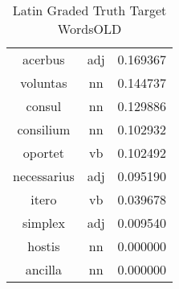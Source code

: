 \begin{table}[h]
\begin{tabular}{ccc}
acerbus     & adj & 0.169367         \\
voluntas    & nn  & 0.144737         \\
consul      & nn  & 0.129886         \\
consilium   & nn  & 0.102932         \\
oportet     & vb  & 0.102492         \\
necessarius & adj & 0.095190         \\
itero       & vb  & 0.039678         \\
simplex     & adj & 0.009540         \\
hostis      & nn  & 0.000000         \\
ancilla     & nn  & 0.000000         \\
\bottomrule
\end{tabular}
\caption{Latin Graded Truth Target WordsOLD}
\label{tab:lat-truthtargetsOLD}
\end{table}


